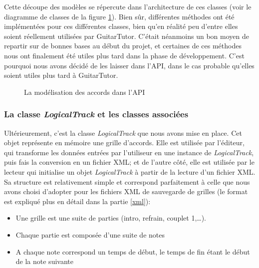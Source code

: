 \documentclass[a4paper,11pt]{article}
\begin{document}
Cette découpe des modèles se répercute dans l'architecture de ces classes (voir le diagramme de classes de la figure \ref{diag_api_chords}). Bien sûr, différentes méthodes ont été implémentées pour ces différentes classes, bien qu'en réalité peu d'entre elles soient réellement utilisées par GuitarTutor. C'était néanmoins un bon moyen de repartir sur de bonnes bases au début du projet, et certaines de ces méthodes nous ont finalement été utiles plus tard dans la phase de développement. C'est pourquoi nous avons décidé de les laisser dans l'API, dans le cas probable qu'elles soient utiles plus tard à GuitarTutor.

\begin{figure}[H]
\begin{center}
\caption{La modélisation des accords dans l'API}
\label{diag_api_chords}
\end{center}
\end{figure}

\subsubsection*{La classe \textit{LogicalTrack} et les classes associées}

Ultérieurement, c'est la classe \textit{LogicalTrack} que nous avons mise en place. Cet objet représente en mémoire une grille d'accords. Elle est utilisée par l'éditeur, qui transforme les données entrées par l'utiliseur en une instance de \textit{LogicalTrack}, puis fais la conversion en un fichier XML; et de l'autre côté, elle est utilisée par le lecteur qui initialise un objet \textit{LogicalTrack} à partir de la lecture d'un fichier XML. Sa structure est relativement simple et correspond parfaitement à celle que nous avons choisi d'adopter pour les fichiers XML de sauvegarde de grilles (le format est expliqué plus en détail dans la partie \ref{xml}):
\begin{itemize}
 \item Une grille est une suite de parties (intro, refrain, couplet 1,\dots).
 \item Chaque partie est composée d'une suite de notes
 \item A chaque note correspond un temps de début, le temps de fin étant le début de la note suivante
\end{itemize}
\end{document}
